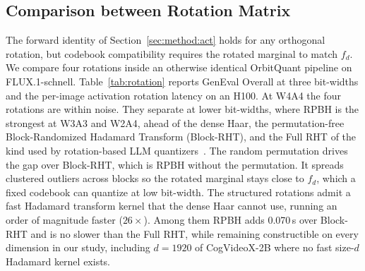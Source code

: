 \begin{table}[t]
\centering
\caption{Rotation-class ablation on FLUX.1-schnell. GenEval Overall (mean over three seeds) at three bit-widths, and the per-image activation-rotation latency at $1024^2$ on an H100 (rotation cost only, summed over all quantized layers and denoising steps).}
\label{tab:rotation}
\vspace{-2mm}
\end{table}


\subsection{Comparison between Rotation Matrix}
\label{sec:ablation:rotation}
The forward identity of Section~\ref{sec:method:act} holds for any orthogonal rotation, but codebook compatibility requires the rotated marginal to match $f_d$. We compare four rotations inside an otherwise identical OrbitQuant pipeline on FLUX.1-schnell. Table~\ref{tab:rotation} reports GenEval Overall at three bit-widths and the per-image activation rotation latency on an H100.
At W4A4 the four rotations are within noise. They separate at lower bit-widths, where RPBH is the strongest at W3A3 and W2A4, ahead of the dense Haar, the permutation-free Block-Randomized Hadamard Transform (Block-RHT), and the Full RHT of the kind used by rotation-based LLM quantizers~\cite{ashkboos2024quarot, tseng2024quip}. The random permutation drives the gap over Block-RHT, which is RPBH without the permutation. It spreads clustered outliers across blocks so the rotated marginal stays close to $f_d$, which a fixed codebook can quantize at low bit-width. The structured rotations admit a fast Hadamard transform kernel that the dense Haar cannot use, running an order of magnitude faster ($26\times$). Among them RPBH adds 0.070\,s over Block-RHT and is no slower than the Full RHT, while remaining constructible on every dimension in our study, including $d{=}1920$ of CogVideoX-2B where no fast size-$d$ Hadamard kernel exists.

